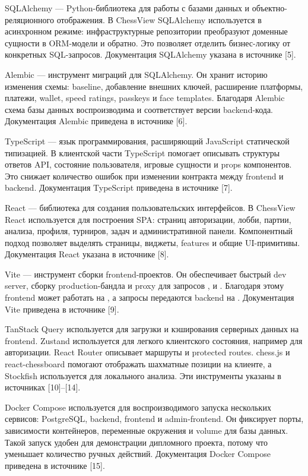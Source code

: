 SQLAlchemy --- Python-библиотека для работы с базами данных и объектно-реляционного отображения. В ChessView SQLAlchemy используется в асинхронном режиме: инфраструктурные репозитории преобразуют доменные сущности в ORM-модели и обратно. Это позволяет отделить бизнес-логику от конкретных SQL-запросов. Документация SQLAlchemy указана в источнике [5].

Alembic --- инструмент миграций для SQLAlchemy. Он хранит историю изменения схемы: baseline, добавление внешних ключей, расширение платформы, платежи, wallet, speed ratings, passkeys и face templates. Благодаря Alembic схема базы данных воспроизводима и соответствует версии backend-кода. Документация Alembic приведена в источнике [6].

TypeScript --- язык программирования, расширяющий JavaScript статической типизацией. В клиентской части TypeScript помогает описывать структуры ответов API, состояние пользователя, игровые сущности и props компонентов. Это снижает количество ошибок при изменении контракта между frontend и backend. Документация TypeScript приведена в источнике [7].

React --- библиотека для создания пользовательских интерфейсов. В ChessView React используется для построения SPA: страниц авторизации, лобби, партии, анализа, профиля, турниров, задач и административной панели. Компонентный подход позволяет выделять страницы, виджеты, features и общие UI-примитивы. Документация React указана в источнике [8].

Vite --- инструмент сборки frontend-проектов. Он обеспечивает быстрый dev server, сборку production-бандла и proxy для запросов ,  и . Благодаря этому frontend может работать на , а запросы передаются backend на . Документация Vite приведена в источнике [9].

TanStack Query используется для загрузки и кэширования серверных данных на frontend. Zustand используется для легкого клиентского состояния, например для авторизации. React Router описывает маршруты и protected routes. chess.js и react-chessboard помогают отображать шахматные позиции на клиенте, а Stockfish используется для локального анализа. Эти инструменты указаны в источниках [10]--[14].

Docker Compose используется для воспроизводимого запуска нескольких сервисов: PostgreSQL, backend, frontend и admin-frontend. Он фиксирует порты, зависимости контейнеров, переменные окружения и volume для базы данных. Такой запуск удобен для демонстрации дипломного проекта, потому что уменьшает количество ручных действий. Документация Docker Compose приведена в источнике [15].

